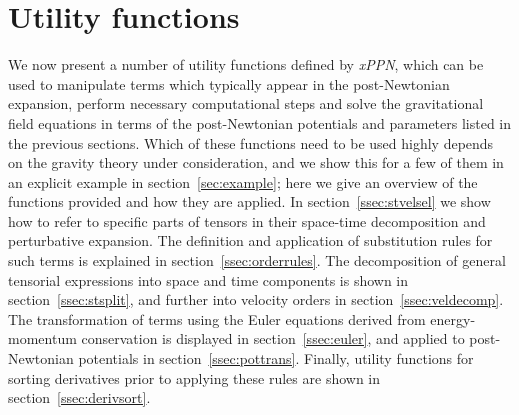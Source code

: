 \documentclass[notitlepage,a4paper,aps,prd,onecolumn,superscriptaddress,nofootinbib,groupedaddress,longbibliography]{revtex4-1}
\newcommand{\xPPN}{\emph{xPPN}}
\begin{document}
\section{Utility functions}\label{sec:functions}
We now present a number of utility functions defined by \xPPN, which can be used to manipulate terms which typically appear in the post-Newtonian expansion, perform necessary computational steps and solve the gravitational field equations in terms of the post-Newtonian potentials and parameters listed in the previous sections. Which of these functions need to be used highly depends on the gravity theory under consideration, and we show this for a few of them in an explicit example in section~\ref{sec:example}; here we give an overview of the functions provided and how they are applied. In section~\ref{ssec:stvelsel} we show how to refer to specific parts of tensors in their space-time decomposition and perturbative expansion. The definition and application of substitution rules for such terms is explained in section~\ref{ssec:orderrules}. The decomposition of general tensorial expressions into space and time components is shown in section~\ref{ssec:stsplit}, and further into velocity orders in section~\ref{ssec:veldecomp}. The transformation of terms using the Euler equations derived from energy-momentum conservation is displayed in section~\ref{ssec:euler}, and applied to post-Newtonian potentials in section~\ref{ssec:pottrans}. Finally, utility functions for sorting derivatives prior to applying these rules are shown in section~\ref{ssec:derivsort}.
\end{document}
